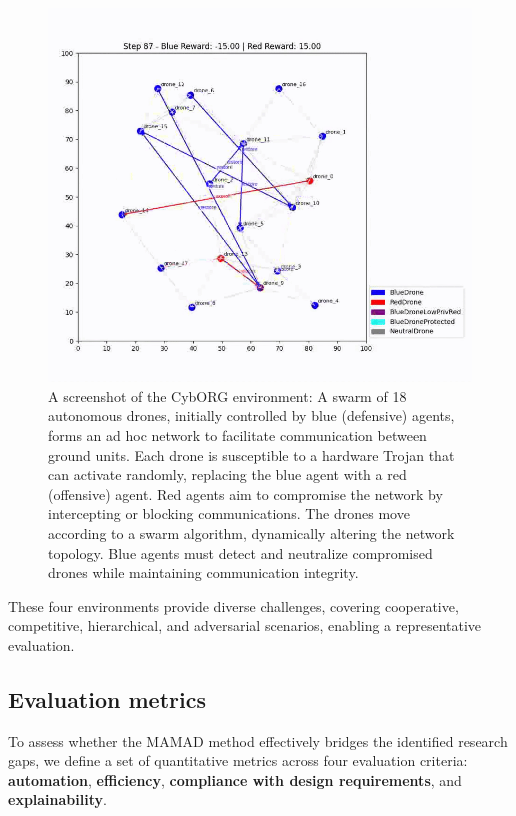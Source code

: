 \documentclass[pdflatex,sn-mathphys-num]{sn-jnl}%
\theoremstyle{thmstyleone}%
\theoremstyle{thmstyletwo}%
\theoremstyle{thmstylethree}%
\begin{document}
\begin{figure}[h!]
    \centering
    \includegraphics[trim=0cm 1cm 0cm 1cm, clip, width=0.6\linewidth]{figures/cyborg.png}
    \caption{A screenshot of the CybORG environment: A swarm of 18 autonomous drones, initially controlled by blue (defensive) agents, forms an ad hoc network to facilitate communication between ground units. Each drone is susceptible to a hardware Trojan that can activate randomly, replacing the blue agent with a red (offensive) agent. Red agents aim to compromise the network by intercepting or blocking communications. The drones move according to a swarm algorithm, dynamically altering the network topology. Blue agents must detect and neutralize compromised drones while maintaining communication integrity.}
    \label{fig:cyborg}
\end{figure}

\medskip

\noindent These four environments provide diverse challenges, covering cooperative, competitive, hierarchical, and adversarial scenarios, enabling a representative evaluation.


\subsection{Evaluation metrics}

To assess whether the MAMAD method effectively bridges the identified research gaps, we define a set of quantitative metrics across four evaluation criteria: \textbf{automation}, \textbf{efficiency}, \textbf{compliance with design requirements}, and \textbf{explainability}.
\end{document}
